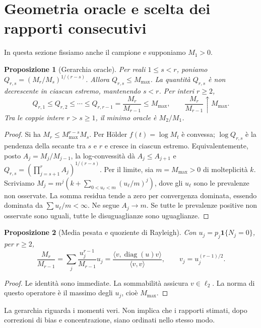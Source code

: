 \documentclass[11pt,a4paper]{article}
\newtheorem{proposition}{Proposizione}[section]
\theoremstyle{remark}\newtheorem{remark}[proposition]{Osservazione}
\newcommand{\ind}{\mathbf1}
\newcommand{\Mmax}{M_{\max}}
\begin{document}
\section{Geometria oracle e scelta dei rapporti consecutivi}
In questa sezione fissiamo anche il campione e supponiamo $M_1>0$.
\begin{proposition}[Gerarchia oracle]\label{prop:oracle}
Per reali $1\le s<r$, poniamo
$Q_{r,s}=(M_r/M_s)^{1/(r-s)}$. Allora $Q_{r,s}\le\Mmax$.
La quantità $Q_{r,s}$ è non decrescente in ciascun estremo, mantenendo $s<r$.
Per interi $r\ge2$,
\[
 Q_{r,1}\le Q_{r,2}\le\cdots\le Q_{r,r-1}
 =\frac{M_r}{M_{r-1}}\le\Mmax,
 \qquad \frac{M_r}{M_{r-1}}\uparrow\Mmax.
\]
Tra le coppie intere $r>s\ge1$, il minimo oracle è $M_2/M_1$.
\end{proposition}
\begin{proof}
Si ha $M_r\le\Mmax^{r-s}M_s$. Per Hölder $f(t)=\log M_t$ è convessa;
$\log Q_{r,s}$ è la pendenza della secante tra $s$ e $r$ e cresce in
ciascun estremo. Equivalentemente, posto $A_j=M_j/M_{j-1}$,
la log-convessità dà $A_j\le A_{j+1}$ e
$Q_{r,s}=(\prod_{j=s+1}^r A_j)^{1/(r-s)}$.
Per il limite, sia $m=\Mmax>0$ di molteplicità $k$. Scriviamo
$M_j=m^j(k+\sum_{0<u_\ell<m}(u_\ell/m)^j)$, dove gli $u_\ell$
sono le prevalenze non osservate. La somma residua tende a zero per
convergenza dominata, essendo dominata da $\sum u_\ell/m<\infty$.
Ne segue $A_j\to m$. Se tutte le prevalenze positive non osservate
sono uguali, tutte le disuguaglianze sono uguaglianze.
\end{proof}
\begin{proposition}[Media pesata e quoziente di Rayleigh]
Con $u_j=p_j\ind\{N_j=0\}$, per $r\ge2$,
\[
 \frac{M_r}{M_{r-1}}=\sum_j\frac{u_j^{r-1}}{M_{r-1}}u_j
 =\frac{\langle v,\operatorname{diag}(u)v\rangle}{\langle v,v\rangle},
 \qquad v_j=u_j^{(r-1)/2}.
\]
\end{proposition}
\begin{proof}
Le identità sono immediate. La sommabilità assicura $v\in\ell_2$.
La norma di questo operatore è il massimo degli $u_j$, cioè $\Mmax$.
\end{proof}
La gerarchia riguarda i momenti veri. Non implica che i rapporti stimati,
dopo correzioni di bias e concentrazione, siano ordinati nello stesso modo.
\end{document}
